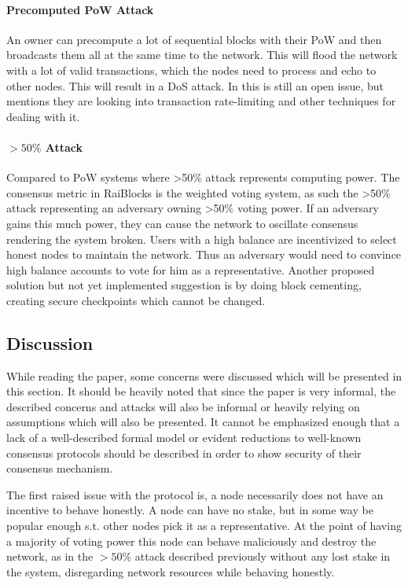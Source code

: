 \paragraph{Precomputed PoW Attack}
An owner can precompute a lot of sequential blocks with their PoW and then broadcasts them all at the same time to the network. This will flood the network with a lot of valid transactions, which the nodes need to process and echo to other nodes. This will result in a DoS attack. In \cite{raiblocks} this is still an open issue, but mentions they are looking into transaction rate-limiting and other techniques for dealing with it.

\paragraph{$>50\%$ Attack}
Compared to PoW systems where >50\% attack represents computing power. The consensus metric in RaiBlocks is the weighted voting system, as such the >50\% attack representing an adversary owning >50\% voting power. If an adversary gains this much power, they can cause the network to oscillate consensus rendering the system broken. Users with a high balance are incentivized to select honest nodes to maintain the network. Thus an adversary would need to convince high balance accounts to vote for him as a representative. Another proposed solution but not yet implemented suggestion is by doing block cementing, creating secure checkpoints which cannot be changed.


\subsection{Discussion}
While reading the paper, some concerns were discussed which will be presented in this section. It should be heavily noted that since the paper is very informal, the described concerns and attacks will also be informal or heavily relying on assumptions which will also be presented. It cannot be emphasized enough that a lack of a well-described formal model or evident reductions to well-known consensus protocols should be described in order to show security of their consensus mechanism.

The first raised issue with the protocol is, a node necessarily does not have an incentive to behave honestly. A node can have no stake, but in some way be popular enough s.t. other nodes pick it as a representative. At the point of having a majority of voting power this node can behave maliciously and destroy the network, as in the $>50\%$ attack described previously without any lost stake in the system, disregarding network resources while behaving honestly.\\

